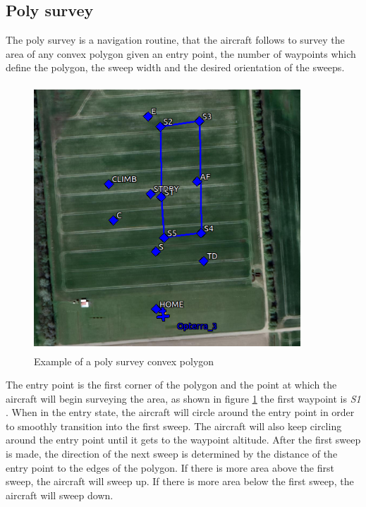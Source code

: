 \subsection{Poly survey}
The poly survey is a navigation routine, that the aircraft follows to survey the area of any convex polygon given an entry point, the number of waypoints which define the polygon, the sweep width and the desired orientation of the sweeps.
\begin{figure}[H]
\centering
\includegraphics[width=10cm,height=10cm,keepaspectratio]{imagenes/Convex_polygon.png}
\caption{Example of a poly survey convex polygon}
\label{fig:Convex_poly}
\end{figure}
The entry point is the first corner of the polygon and the point at which the aircraft will begin surveying the area, as shown in figure \ref{fig:Convex_poly} the first waypoint is  \textit{S1} . When in the entry state, the aircraft will circle around the entry point in order to smoothly transition into the first sweep. The aircraft will also keep circling around the entry point until it gets to the waypoint altitude. After the first sweep is made, the direction of the next sweep is determined by the distance of the entry point to the edges of the polygon. If there is more area above the first sweep, the aircraft will sweep up. If there is more area below the first sweep, the aircraft will sweep down.\cite{Poly_survey}

